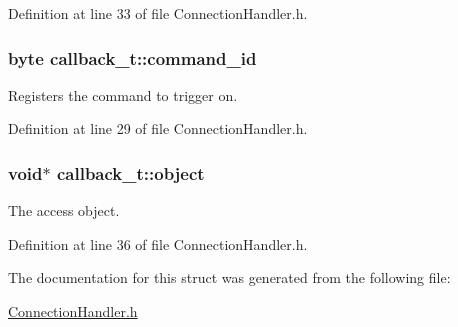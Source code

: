\-Definition at line 33 of file \-Connection\-Handler.\-h.

\hypertarget{structcallback__t_ada2c0e2a936e49f0ece582c40953c278}{
\subsubsection[{command\-\_\-id}]{\setlength{\rightskip}{0pt plus 5cm}byte {\bf callback\-\_\-t\-::command\-\_\-id}}}\label{structcallback__t_ada2c0e2a936e49f0ece582c40953c278}


\-Registers the command to trigger on. 



\-Definition at line 29 of file \-Connection\-Handler.\-h.

\hypertarget{structcallback__t_a30ed93032c0a2ead09070156d7c37790}{
\subsubsection[{object}]{\setlength{\rightskip}{0pt plus 5cm}void$\ast$ {\bf callback\-\_\-t\-::object}}}\label{structcallback__t_a30ed93032c0a2ead09070156d7c37790}


\-The access object. 



\-Definition at line 36 of file \-Connection\-Handler.\-h.



\-The documentation for this struct was generated from the following file\-:\begin{DoxyCompactItemize}
\item 
\hyperlink{_connection_handler_8h}{\-Connection\-Handler.\-h}\end{DoxyCompactItemize}
